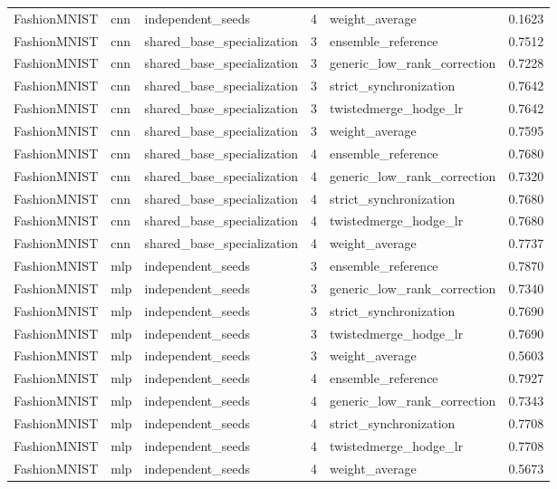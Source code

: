 \begin{table}[t]
\begin{tabular}{llllll}
FashionMNIST & cnn & independent\_seeds & 4 & weight\_average & 0.1623 \\
FashionMNIST & cnn & shared\_base\_specialization & 3 & ensemble\_reference & 0.7512 \\
FashionMNIST & cnn & shared\_base\_specialization & 3 & generic\_low\_rank\_correction & 0.7228 \\
FashionMNIST & cnn & shared\_base\_specialization & 3 & strict\_synchronization & 0.7642 \\
FashionMNIST & cnn & shared\_base\_specialization & 3 & twistedmerge\_hodge\_lr & 0.7642 \\
FashionMNIST & cnn & shared\_base\_specialization & 3 & weight\_average & 0.7595 \\
FashionMNIST & cnn & shared\_base\_specialization & 4 & ensemble\_reference & 0.7680 \\
FashionMNIST & cnn & shared\_base\_specialization & 4 & generic\_low\_rank\_correction & 0.7320 \\
FashionMNIST & cnn & shared\_base\_specialization & 4 & strict\_synchronization & 0.7680 \\
FashionMNIST & cnn & shared\_base\_specialization & 4 & twistedmerge\_hodge\_lr & 0.7680 \\
FashionMNIST & cnn & shared\_base\_specialization & 4 & weight\_average & 0.7737 \\
FashionMNIST & mlp & independent\_seeds & 3 & ensemble\_reference & 0.7870 \\
FashionMNIST & mlp & independent\_seeds & 3 & generic\_low\_rank\_correction & 0.7340 \\
FashionMNIST & mlp & independent\_seeds & 3 & strict\_synchronization & 0.7690 \\
FashionMNIST & mlp & independent\_seeds & 3 & twistedmerge\_hodge\_lr & 0.7690 \\
FashionMNIST & mlp & independent\_seeds & 3 & weight\_average & 0.5603 \\
FashionMNIST & mlp & independent\_seeds & 4 & ensemble\_reference & 0.7927 \\
FashionMNIST & mlp & independent\_seeds & 4 & generic\_low\_rank\_correction & 0.7343 \\
FashionMNIST & mlp & independent\_seeds & 4 & strict\_synchronization & 0.7708 \\
FashionMNIST & mlp & independent\_seeds & 4 & twistedmerge\_hodge\_lr & 0.7708 \\
FashionMNIST & mlp & independent\_seeds & 4 & weight\_average & 0.5673 \\

\end{tabular}
\end{table}

